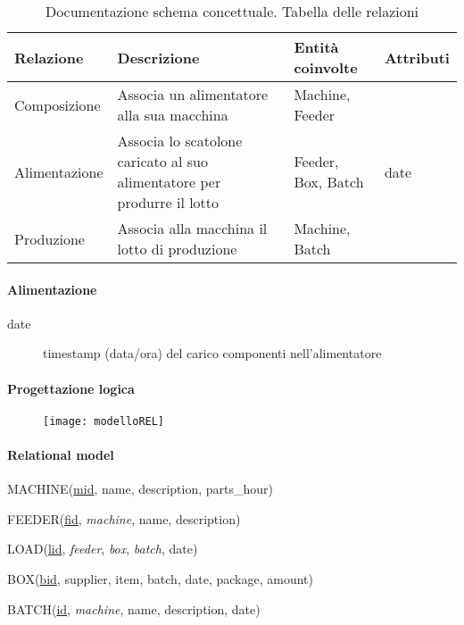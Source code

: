 \begin{table}
\begin{tabular}{| l | p{3cm} | p{3cm} | p{3cm} |}
\hline Relazione & Descrizione & Entità coinvolte & Attributi\\
\hline Composizione & Associa un alimentatore alla sua macchina & Machine, Feeder & \\
\hline Alimentazione & Associa lo scatolone caricato al suo alimentatore per produrre il lotto& Feeder, Box, Batch & date\\
\hline Produzione & Associa alla macchina il lotto di produzione & Machine, Batch & \\
\hline
\end{tabular}
\label{tab:errelationship}
\caption[Documentazione ER: relazioni]{Documentazione schema concettuale. Tabella delle relazioni}
\end{table}
\paragraph{Alimentazione}
\begin{description}
\item[date] timestamp (data/ora) del carico componenti nell'alimentatore
\end{description}

\paragraph{Progettazione logica}
\begin{figure}
\centering
\texttt{[image: modelloREL]}
\caption{}
\label{}
\end{figure}

\paragraph{Relational model}
\hfill

MACHINE(\underline{mid}, name, description, parts\_hour)

FEEDER(\underline{fid}, \textit{machine}, name, description)

LOAD(\underline{lid}, \textit{feeder}, \textit{box}, \textit{batch}, date)

BOX(\underline{bid}, supplier, item, batch, date, package, amount)

BATCH(\underline{id}, \textit{machine}, name, description, date)

